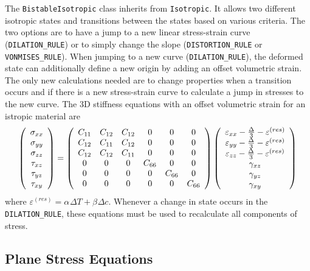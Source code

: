 \documentclass[11pt]{article}
\def\a#1{\alpha_{#1}}
\def\b#1{\beta_{#1}}
\def\code#1{{\small\tt #1}}
\def\DT{\Delta T}
\def\e#1{\varepsilon_{#1}}
\def\er#1{\varepsilon_{#1}^{(res)}}
\def\g#1{\gamma_{#1}}
\def\s#1{\sigma_{#1}}
\def\t#1{\tau_{#1}}
\begin{document}
The \code{BistableIsotropic} class inherits from \code{Isotropic}. It allows two different isotropic states and transitions  between the states based on various criteria. The two options are to have a jump to a new linear stress-strain curve (\code{DILATION\_RULE}) or to simply change the slope (\code{DISTORTION\_RULE} or \code{VONMISES\_RULE}). When jumping to a new curve (\code{DILATION\_RULE}), the deformed state can additionally define a new origin by adding an offset volumetric strain. The only new calculations needed are to change properties when a transition occurs and if there is a new stress-strain curve to calculate a jump in stresses to the new curve. The 3D stiffness equations with an offset volumetric strain for an istropic material are
\begin{equation}
     \left(\begin{array}{c} \s{xx} \\ \s{yy} \\ \s{zz} \\ \t{xz} \\ \t{yz} \\ \t{xy} \end{array}\right)
       =  \left(\begin{array}{cccccc}
      C_{11} & C_{12} & C_{12} & 0 & 0 & 0 \\
      C_{12} & C_{11} & C_{12} & 0 & 0 & 0 \\
      C_{12} & C_{12} & C_{11} & 0 & 0 & 0 \\
      0 & 0 & 0 & C_{66} & 0 & 0 \\
      0 & 0 & 0 & 0 & C_{66} & 0  \\
      0 & 0 & 0 & 0 & 0 &  C_{66}  \end{array}\right)
     \left(\begin{array}{c} \e{xx} - {\Delta\over 3} -\er{}\\ \e{yy} - {\Delta\over 3} -\er{}\\ 
                   \e{zz} - {\Delta\over 3} - \er{}\\ 
                   \g{xz} \\ \g{yz} \\ \g{xy} \end{array}\right)
\end{equation}
where $\er{}=\a{}\DT+\b{}\Delta c$.
Whenever a change in state occurs in the \code{DILATION\_RULE}, these equations must be used to recalculate all components of stress.

\subsection{Plane Stress Equations}
\end{document}
